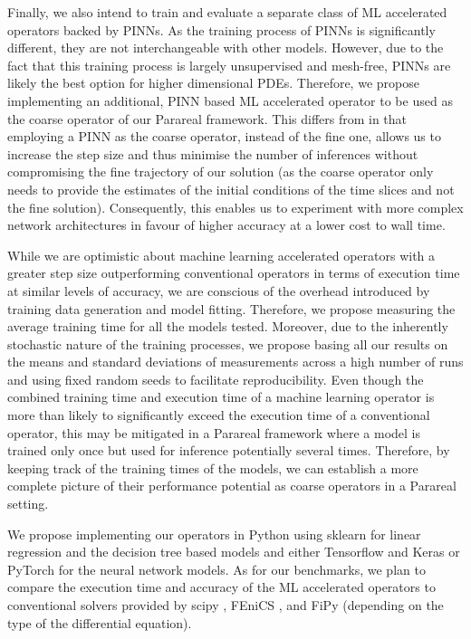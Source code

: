 \documentclass{article}
\begin{document}
Finally, we also intend to train and evaluate a separate class of ML accelerated operators backed by PINNs. As the training process of PINNs is significantly different, they are not interchangeable with other models. However, due to the fact that this training process is largely unsupervised and mesh-free, PINNs are likely the best option for higher dimensional PDEs. Therefore, we propose implementing an additional, PINN based ML accelerated operator to be used as the coarse operator of our Parareal framework. This differs from \cite{meng2019} in that employing a PINN as the coarse operator, instead of the fine one, allows us to increase the step size and thus minimise the number of inferences without compromising the fine trajectory of our solution (as the coarse operator only needs to provide the estimates of the initial conditions of the time slices and not the fine solution). Consequently, this enables us to experiment with more complex network architectures in favour of higher accuracy at a lower cost to wall time.

While we are optimistic about machine learning accelerated operators with a greater step size outperforming conventional operators in terms of execution time at similar levels of accuracy, we are conscious of the overhead introduced by training data generation and model fitting. Therefore, we propose measuring the average training time for all the models tested. Moreover, due to the inherently stochastic nature of the training processes, we propose basing all our results on the means and standard deviations of measurements across a high number of runs and using fixed random seeds to facilitate reproducibility. Even though the combined training time and execution time of a machine learning operator is more than likely to significantly exceed the execution time of a conventional operator, this may be mitigated in a Parareal framework where a model is trained only once but used for inference potentially several times. Therefore, by keeping track of the training times of the models, we can establish a more complete picture of their performance potential as coarse operators in a Parareal setting.

We propose implementing our operators in Python using sklearn for linear regression and the decision tree based models and either Tensorflow \cite{mart2015} and Keras \cite{chollet2015} or PyTorch \cite{paszke2019} for the neural network models. As for our benchmarks, we plan to compare the execution time and accuracy of the ML accelerated operators to conventional solvers provided by scipy \cite{scipy2020}, FEniCS \cite{fenics2015}, and FiPy \cite{fipy2009} (depending on the type of the differential equation).
\end{document}
